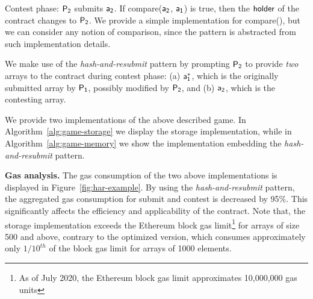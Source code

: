 \noindent \textsf{Contest phase:} $\mathsf{P_2}$ submits $\mathsf{a_2}$. If
\textsf{compare}($\mathsf{a_2}$, $\mathsf{a_1}$) is true, then the $\mathsf{holder}$ of the contract
changes to $\mathsf{P_2}$. We provide a simple implementation for \textsf{compare()},
but we can consider any notion of comparison, since the pattern is abstracted
from such implementation details.

We make use of the \emph{hash-and-resubmit} pattern by prompting $\mathsf{P_2}$ to
provide \emph{two} arrays to the contract during contest phase: (a) $\mathsf{a_1^*}$,
which is the originally submitted array by $\mathsf{P_1}$, possibly modified by $\mathsf{P_2}$,
and (b) $\mathsf{a_2}$, which is the contesting array.

We provide two implementations of the above described game.
In Algorithm~\ref{alg:game-storage} we display the storage implementation,
while in Algorithm~\ref{alg:game-memory} we show the implementation
embedding the \emph{hash-and-resubmit} pattern.



\noindent \textbf{Gas analysis.} The gas consumption of the two above
implementations is displayed in Figure~\ref{fig:har-example}. By using the
\emph{hash-and-resubmit} pattern, the aggregated gas consumption for
\textsf{submit} and \textsf{contest} is decreased by 95\%. This significantly
affects the efficiency and applicability of the contract. Note that, the
storage implementation exceeds the Ethereum block gas limit\footnote{As of July
2020, the Ethereum block gas limit approximates 10,000,000 gas units} for
arrays of size 500 and above, contrary to the optimized version, which consumes
approximately only $1/10^{th}$ of the block gas limit for arrays of 1000
elements.

